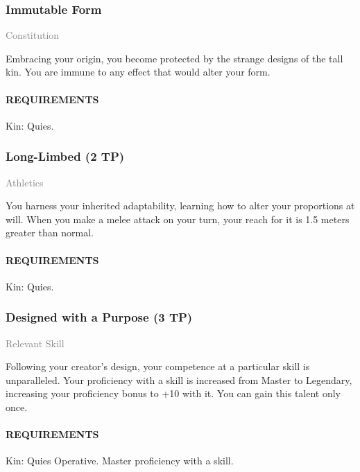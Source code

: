     \subsubsection{Immutable Form} \label{tal::immutableform}
    \small{\textcolor{gray}{Constitution}}

    \normalsize
    Embracing your origin, you become protected by the strange designs of the tall kin.
    You are immune to any effect that would alter your form.
    \paragraph{REQUIREMENTS} Kin: Quies.

    \subsubsection{Long-Limbed (2 TP)} \label{tal::longlimbed}
    \small{\textcolor{gray}{Athletics}}

    \normalsize
    You harness your inherited adaptability, learning how to alter your proportions at will.
    When you make a melee attack on your turn, your reach for it is 1.5 meters greater than normal.
    \paragraph{REQUIREMENTS} Kin: Quies.

    \subsubsection{Designed with a Purpose (3 TP)} \label{tal::designedwithapurpose}
    \small{\textcolor{gray}{Relevant Skill}}

    \normalsize
    Following your creator's design, your competence at a particular skill is unparalleled.
    Your proficiency with a skill is increased from Master to Legendary, increasing your proficiency bonus to +10 with it.
    You can gain this talent only once.
    \paragraph{REQUIREMENTS} Kin: Quies Operative. Master proficiency with a skill.
